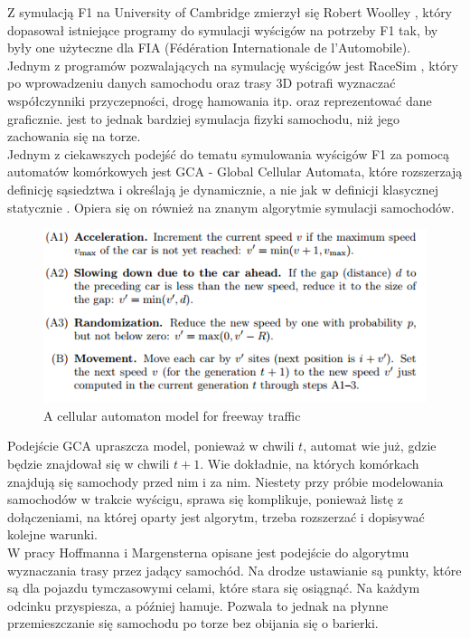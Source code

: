 \documentclass{article}
\begin{document}
Z symulacją F1 na University of Cambridge zmierzył się Robert Woolley \cite{woolley}, który dopasował istniejące programy do symulacji wyścigów na potrzeby F1 tak, by były one użyteczne dla FIA (Fédération Internationale de l'Automobile). \\

Jednym z programów pozwalających na symulację wyścigów jest RaceSim \cite{race}, który po wprowadzeniu danych samochodu oraz trasy 3D potrafi wyznaczać współczynniki przyczepności, drogę hamowania itp. oraz reprezentować dane graficznie.  jest to jednak bardziej symulacja fizyki samochodu, niż jego zachowania się na torze. \\

Jednym z ciekawszych podejść do tematu symulowania wyścigów F1 za pomocą automatów komórkowych jest GCA - Global Cellular Automata, które rozszerzają definicję sąsiedztwa i określają je dynamicznie, a nie jak w definicji klasycznej statycznie \cite{gca}. Opiera się on również na znanym algorytmie symulacji samochodów.

\begin{center}
\begin{figure}[h]
\includegraphics[scale=0.9]{alg.png}
\caption{A cellular automaton model for freeway traffic}
\end{figure}
\end{center}

Podejście GCA upraszcza model, ponieważ w chwili $t$, automat wie już, gdzie będzie znajdował się w chwili $t+1$. Wie dokładnie, na których komórkach znajdują się samochody przed nim i za nim. Niestety przy próbie modelowania samochodów w trakcie wyścigu, sprawa się komplikuje, ponieważ listę z dołączeniami, na której oparty jest algorytm, trzeba rozszerzać i dopisywać kolejne warunki. \\

W pracy Hoffmanna i Margensterna opisane jest podejście do algorytmu wyznaczania trasy przez jadący samochód. Na drodze ustawianie są punkty, które są dla pojazdu tymczasowymi celami, które stara się osiągnąć. Na każdym odcinku przyspiesza, a później hamuje. Pozwala to jednak na płynne przemieszczanie się samochodu po torze bez obijania się o barierki.
\end{document}
